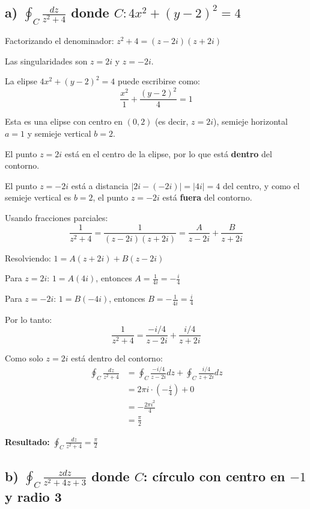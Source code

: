 \documentclass{article}
\begin{document}
\subsection*{a) $\oint_C \frac{dz}{z^2 + 4}$ donde $C: 4x^2 + (y - 2)^2 = 4$}

Factorizando el denominador: $z^2 + 4 = (z - 2i)(z + 2i)$

Las singularidades son $z = 2i$ y $z = -2i$.

La elipse $4x^2 + (y - 2)^2 = 4$ puede escribirse como:
$$\frac{x^2}{1} + \frac{(y - 2)^2}{4} = 1$$

Esta es una elipse con centro en $(0, 2)$ (es decir, $z = 2i$), semieje horizontal $a = 1$ y semieje vertical $b = 2$.

El punto $z = 2i$ está en el centro de la elipse, por lo que está \textbf{dentro} del contorno.

El punto $z = -2i$ está a distancia $|2i - (-2i)| = |4i| = 4$ del centro, y como el semieje vertical es $b = 2$, el punto $z = -2i$ está \textbf{fuera} del contorno.

Usando fracciones parciales:
$$\frac{1}{z^2 + 4} = \frac{1}{(z - 2i)(z + 2i)} = \frac{A}{z - 2i} + \frac{B}{z + 2i}$$

Resolviendo: $1 = A(z + 2i) + B(z - 2i)$

Para $z = 2i$: $1 = A(4i)$, entonces $A = \frac{1}{4i} = -\frac{i}{4}$

Para $z = -2i$: $1 = B(-4i)$, entonces $B = -\frac{1}{4i} = \frac{i}{4}$

Por lo tanto:
$$\frac{1}{z^2 + 4} = \frac{-i/4}{z - 2i} + \frac{i/4}{z + 2i}$$

Como solo $z = 2i$ está dentro del contorno:
\begin{align*}
\oint_C \frac{dz}{z^2 + 4} &= \oint_C \frac{-i/4}{z - 2i} dz + \oint_C \frac{i/4}{z + 2i} dz \\
                            &= 2\pi i \cdot \left(-\frac{i}{4}\right) + 0 \\
                            &= -\frac{2\pi i^2}{4} \\
                            &= \frac{\pi}{2}
\end{align*}

\textbf{Resultado:} $\oint_C \frac{dz}{z^2 + 4} = \frac{\pi}{2}$

\subsection*{b) $\oint_C \frac{z dz}{z^2 + 4z + 3}$ donde $C$: círculo con centro en $-1$ y radio 3}
\end{document}
